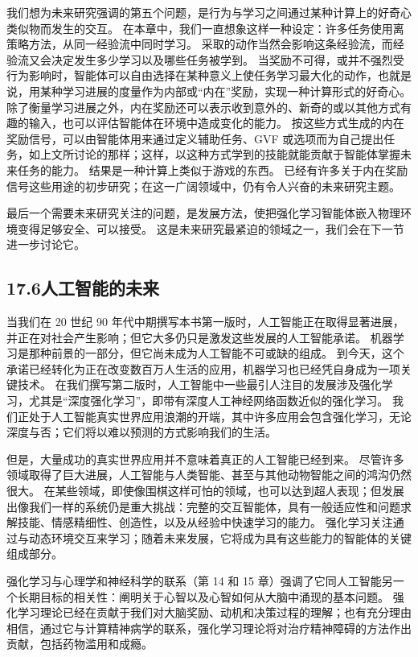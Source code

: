 \documentclass[UTF8,12pt,a4paper,fontset=fandol]{ctexart}
\begin{document}
我们想为未来研究强调的第五个问题，是行为与学习之间通过某种计算上的好奇心类似物而发生的交互。
在本章中，我们一直想象这样一种设定：许多任务使用离策略方法，从同一经验流中同时学习。
采取的动作当然会影响这条经验流，而经验流又会决定发生多少学习以及哪些任务被学到。
当奖励不可得，或并不强烈受行为影响时，智能体可以自由选择在某种意义上使任务学习最大化的动作，也就是说，用某种学习进展的度量作为内部或“内在”奖励，实现一种计算形式的好奇心。
除了衡量学习进展之外，内在奖励还可以表示收到意外的、新奇的或以其他方式有趣的输入，也可以评估智能体在环境中造成变化的能力。
按这些方式生成的内在奖励信号，可以由智能体用来通过定义辅助任务、GVF 或选项而为自己提出任务，如上文所讨论的那样；这样，以这种方式学到的技能就能贡献于智能体掌握未来任务的能力。
结果是一种计算上类似于游戏的东西。
已经有许多关于内在奖励信号这些用途的初步研究；在这一广阔领域中，仍有令人兴奋的未来研究主题。

最后一个需要未来研究关注的问题，是发展方法，使把强化学习智能体嵌入物理环境变得足够安全、可以接受。
这是未来研究最紧迫的领域之一，我们会在下一节进一步讨论它。

\subsection*{17.6\quad 人工智能的未来}

当我们在 20 世纪 90 年代中期撰写本书第一版时，人工智能正在取得显著进展，并正在对社会产生影响；但它大多仍只是激发这些发展的人工智能承诺。
机器学习是那种前景的一部分，但它尚未成为人工智能不可或缺的组成。
到今天，这个承诺已经转化为正在改变数百万人生活的应用，机器学习也已经凭自身成为一项关键技术。
在我们撰写第二版时，人工智能中一些最引人注目的发展涉及强化学习，尤其是“深度强化学习”，即带有深度人工神经网络函数近似的强化学习。
我们正处于人工智能真实世界应用浪潮的开端，其中许多应用会包含强化学习，无论深度与否；它们将以难以预测的方式影响我们的生活。

但是，大量成功的真实世界应用并不意味着真正的人工智能已经到来。
尽管许多领域取得了巨大进展，人工智能与人类智能、甚至与其他动物智能之间的鸿沟仍然很大。
在某些领域，即使像围棋这样可怕的领域，也可以达到超人表现；但发展出像我们一样的系统仍是重大挑战：完整的交互智能体，具有一般适应性和问题求解技能、情感精细性、创造性，以及从经验中快速学习的能力。
强化学习关注通过与动态环境交互来学习；随着未来发展，它将成为具有这些能力的智能体的关键组成部分。

强化学习与心理学和神经科学的联系（第 14 和 15 章）强调了它同人工智能另一个长期目标的相关性：阐明关于心智以及心智如何从大脑中涌现的基本问题。
强化学习理论已经在贡献于我们对大脑奖励、动机和决策过程的理解；也有充分理由相信，通过它与计算精神病学的联系，强化学习理论将对治疗精神障碍的方法作出贡献，包括药物滥用和成瘾。
\end{document}
